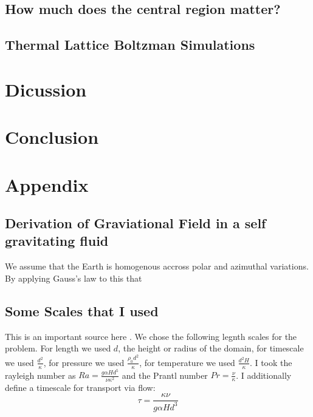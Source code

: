 \documentclass{article}
\begin{document}
\subsection*{How much does the central region matter?}








\subsection*{Thermal Lattice Boltzman Simulations}



\section*{Dicussion}


\section*{Conclusion}


\section*{Appendix}

\subsection*{Derivation of Graviational Field in a self gravitating fluid}
We assume that the Earth is homogenous accross polar and azimuthal variations. By applying Gauss's law to this that 


\subsection*{Some Scales that I used}
This is an important source here \cite{goluskin2016internally}.
\newline
We chose the following legnth scales for the problem. For length we used $d$, the height or radius of the domain, 
for timescale we used $\frac{d^2}{\kappa}$, for pressure we used $\frac{\rho_0 d^2}{\kappa}$, for temperature we used $\frac{d^2 H}{\kappa}$. 
I took the rayleigh number as $Ra = \frac{g \alpha H d^5}{\nu \kappa^2}$ and the Prantl number $Pr = \frac{\nu}{\kappa}$. I additionally define a timescale for transport via flow:
\begin{equation}
	\tau = \frac{\kappa \nu}{g \alpha H d^3}
\end{equation}






\end{document}

